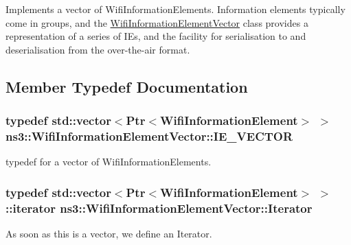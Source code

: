 Implements a vector of Wifi\+Information\+Elements. Information elements typically come in groups, and the \hyperlink{classns3_1_1WifiInformationElementVector}{Wifi\+Information\+Element\+Vector} class provides a representation of a series of I\+Es, and the facility for serialisation to and deserialisation from the over-\/the-\/air format. 

\subsection{Member Typedef Documentation}
\subsubsection[{\texorpdfstring{I\+E\+\_\+\+V\+E\+C\+T\+OR}{IE_VECTOR}}]{\setlength{\rightskip}{0pt plus 5cm}typedef std\+::vector$<${\bf Ptr}$<${\bf Wifi\+Information\+Element}$>$ $>$ {\bf ns3\+::\+Wifi\+Information\+Element\+Vector\+::\+I\+E\+\_\+\+V\+E\+C\+T\+OR}\hspace{0.3cm}{\ttfamily [protected]}}\hypertarget{classns3_1_1WifiInformationElementVector_a948b975695a214bd58ba7f403b5afed7}{}\label{classns3_1_1WifiInformationElementVector_a948b975695a214bd58ba7f403b5afed7}
typedef for a vector of Wifi\+Information\+Elements. 
\subsubsection[{\texorpdfstring{Iterator}{Iterator}}]{\setlength{\rightskip}{0pt plus 5cm}typedef std\+::vector$<${\bf Ptr}$<${\bf Wifi\+Information\+Element}$>$ $>$\+::iterator {\bf ns3\+::\+Wifi\+Information\+Element\+Vector\+::\+Iterator}}\hypertarget{classns3_1_1WifiInformationElementVector_a19429192ca24ca8c4c51fe1f998e0a2f}{}\label{classns3_1_1WifiInformationElementVector_a19429192ca24ca8c4c51fe1f998e0a2f}


As soon as this is a vector, we define an Iterator. 



